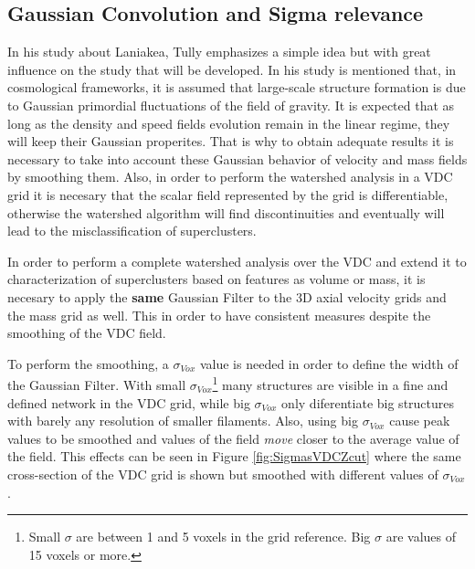 \documentclass[a4paper,fleqn,usenatbib]{mnras}
\begin{document}
\subsection{Gaussian Convolution and Sigma relevance}

In his study about Laniakea, Tully\cite{tully_laniakea_2014} emphasizes a simple idea but with great influence on the study that will be developed. In his study is mentioned that, in cosmological frameworks, it is assumed that large-scale structure formation is due to Gaussian primordial fluctuations of the field of gravity. It is expected that as long as the density and speed fields evolution remain in the linear regime, they will keep their Gaussian properites. That is why to obtain adequate results it is necessary to take into account these Gaussian behavior of velocity and mass fields by smoothing them.
Also, in order to perform the watershed analysis in a VDC grid it is necesary that the scalar field represented by the grid is differentiable, otherwise the watershed algorithm will find discontinuities and eventually will lead to the misclassification of superclusters.

In order to perform a complete watershed analysis over the VDC and extend it to characterization of superclusters based on features as volume or mass,  it is necesary to apply the  \textbf{same} Gaussian Filter to the 3D axial velocity grids and the mass grid as well. This in order to have consistent measures despite the smoothing of the VDC field.




To perform the smoothing, a $\sigma_{Vox}$ value is needed in order to define the width of the Gaussian Filter. With small $\sigma_{Vox}$\footnote{Small $\sigma$ are between 1 and 5 voxels in the grid reference. Big $\sigma$ are values of 15 voxels or more.} many structures are visible in a fine and defined network in the VDC grid, while big $\sigma_{Vox}$ only diferentiate big structures with barely any resolution of smaller filaments. Also, using big $\sigma_{Vox}$ cause peak values to be smoothed and values of the field \textit{move }closer to  the average value of the field. This effects can be seen in Figure \ref{fig:SigmasVDCZcut} where the same cross-section of the VDC grid is shown but smoothed with different values of $\sigma_{Vox}$.
\end{document}
